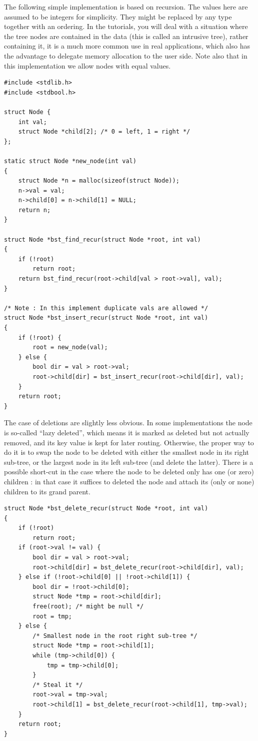 \documentclass[12pt]{article}
\theoremstyle{plain}
\theoremstyle{remark}
\begin{document}
The following simple implementation is based on recursion. The values
here are assumed to be integers for simplicity. They might be replaced by any 
type together with an ordering.  In the tutorials, you will deal with a situation where
the tree nodes are contained in the data (this is called an intrusive tree), 
rather containing it, it is a much more common use in real applications, which
also has the advantage to delegate memory allocation to the user side.
Note also that in this implementation we allow nodes with equal values.

\begin{lstlisting}[style=C]
#include <stdlib.h>
#include <stdbool.h>

struct Node {
	int val;
	struct Node *child[2]; /* 0 = left, 1 = right */
};

static struct Node *new_node(int val)
{
	struct Node *n = malloc(sizeof(struct Node));
	n->val = val;
	n->child[0] = n->child[1] = NULL;
	return n;
}

struct Node *bst_find_recur(struct Node *root, int val)
{
	if (!root)
		return root;
	return bst_find_recur(root->child[val > root->val], val);
}

/* Note : In this implement duplicate vals are allowed */
struct Node *bst_insert_recur(struct Node *root, int val)
{
	if (!root) {
		root = new_node(val);
	} else {
		bool dir = val > root->val;
		root->child[dir] = bst_insert_recur(root->child[dir], val);
	}
	return root;
}
\end{lstlisting}

The case of deletions are slightly less obvious. In some implementations the
node is so-called ``lazy deleted'', which means it is marked as deleted but not
actually removed, and its key value is kept for later routing. Otherwise, the
proper way to do it is to swap the node to be deleted with either the smallest
node in its right sub-tree, or the largest node in its left sub-tree (and delete
the latter). There is a possible short-cut in the case where the node to be 
deleted only has one (or zero) children : in that case it suffices to deleted
the node and attach its (only or none) children to its grand parent. 

\begin{lstlisting}[style=C]
struct Node *bst_delete_recur(struct Node *root, int val)
{
	if (!root)
		return root;
	if (root->val != val) {
		bool dir = val > root->val;
		root->child[dir] = bst_delete_recur(root->child[dir], val);
	} else if (!root->child[0] || !root->child[1]) {
		bool dir = !root->child[0];
		struct Node *tmp = root->child[dir];
		free(root); /* might be null */
		root = tmp;
	} else {
		/* Smallest node in the root right sub-tree */
		struct Node *tmp = root->child[1];
		while (tmp->child[0]) {
			tmp = tmp->child[0];
		}
		/* Steal it */
		root->val = tmp->val;
		root->child[1] = bst_delete_recur(root->child[1], tmp->val);
	}
	return root;
}
\end{lstlisting}
\end{document}
